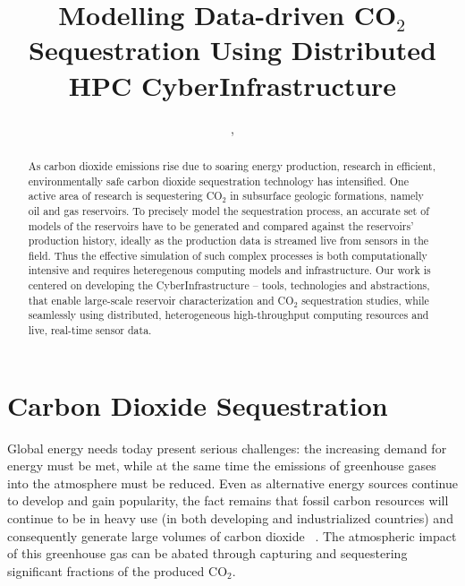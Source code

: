 \documentclass[10pt,conference,final]{IEEEtran}
\begin{document}
\title{Modelling Data-driven CO$_{2}$ Sequestration Using Distributed HPC CyberInfrastructure}

 \author{,
    }


\maketitle

\begin{abstract} As carbon dioxide emissions rise due to soaring energy production, research in efficient, environmentally safe carbon dioxide sequestration technology has intensified.  One active area of research is sequestering CO$_2$ in subsurface geologic formations, namely oil and gas reservoirs. To precisely model the sequestration process, an accurate set of models of the reservoirs have to be generated and compared against the reservoirs' production history, ideally as the production data is streamed live from sensors in the field. Thus the effective simulation of such complex processes is both computationally intensive and requires heteregenous computing models and infrastructure.  Our work is centered on developing the CyberInfrastructure -- tools, technologies and abstractions, that enable large-scale reservoir characterization and CO$_2$ sequestration studies, %
  while seamlessly using distributed, heterogeneous high-throughput computing resources and live, real-time sensor data.  \end{abstract}


\section*{Carbon Dioxide Sequestration}
Global energy needs today present serious challenges: the increasing demand for energy 
must be met, while at the same time the 
emissions of greenhouse gases into the atmosphere must be reduced.
Even as alternative energy sources continue to develop and gain 
popularity, the fact remains that fossil carbon resources will continue to be in heavy use 
(in both developing and industrialized countries) and consequently generate 
large volumes of carbon dioxide ~\cite{GeoRPT}. The atmospheric impact of this greenhouse gas 
can be abated through capturing and sequestering significant fractions of the produced 
CO$_2$.
\end{document}
